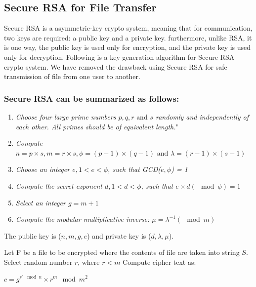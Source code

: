 \documentclass[conference]{IEEEtran}
\begin{document}
\subsection{{\large Secure RSA for File Transfer}}
\label{sec:secureMrea}

Secure RSA\cite{mrea} is a asymmetric-key crypto system, meaning that for communication, two keys are required: a public key and a private key. furthermore, unlike RSA, it is one way, the public key is used only for encryption, and the private key is used only for decryption. Following is a key generation algorithm for Secure RSA crypto system. We have removed the drawback using Secure RSA for safe transmission of file from one user to another.

\subsubsection{\bf Secure RSA can be summarized as follows:}
\label{sec:mrea_algo}
\begin{enumerate}[ {STEP }1{:} ]
	\item \emph{Choose four large prime numbers $p, q, r \text{ and } s$ randomly and independently of each other. All primes should be of equivalent length.}"
	\item \emph{Compute $n = p \times s, m=r \times s, \phi = (p-1)\times(q-1) \text{ and } \lambda = (r-1) \times (s-1)$}
	\item \emph{Choose an integer $e, 1 < e < \phi$, such that GCD($e, \phi$) = 1}
		\label{itm:step3}
	\item \emph{Compute the secret exponent $d, 1 < d < \phi$, such that $e \times d (\mod \phi) = 1$}
		\label{itm:step6}
	\item \emph{Select an integer $g = m+1$}
	\item \emph{Compute the modular multiplicative inverse: $\mu = \lambda^{-1} (\mod m)$}
\end{enumerate}
The public key is ($n, m, g, e$) and private key is ($d, \lambda, \mu$). 

Let F be a file to be encrypted where the contents of file are taken into string $S$. Select random number $r$, where $r<m$ Compute cipher text as:
\begin{center}
	$c = g^{s^{e}\mod n} \times r^{m}\mod m^{2}$
\end{center}
\end{document}
